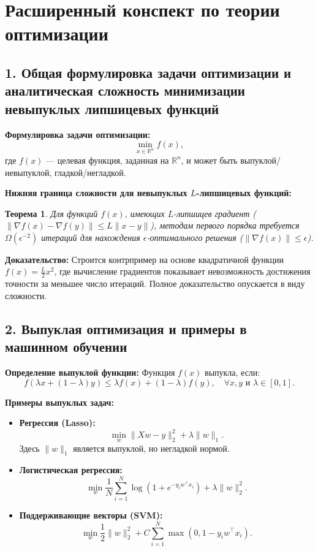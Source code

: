 \documentclass[a4paper,12pt]{article}
\newtheorem{theorem}{Теорема}
\begin{document}
\section*{Расширенный конспект по теории оптимизации}

\subsection*{1. Общая формулировка задачи оптимизации и аналитическая сложность минимизации невыпуклых липшицевых функций}
\textbf{Формулировка задачи оптимизации:}
\[
\min_{x \in \mathbb{R}^n} f(x),
\]
где \(f(x)\) --- целевая функция, заданная на \(\mathbb{R}^n\), и может быть выпуклой/невыпуклой, гладкой/негладкой.

\textbf{Нижняя граница сложности для невыпуклых \(L\)-липшицевых функций:}
\begin{theorem}
Для функций \(f(x)\), имеющих \(L\)-липшицев градиент (\(\|\nabla f(x) - \nabla f(y)\| \leq L\|x - y\|\)), методам первого порядка требуется \(\Omega(\epsilon^{-2})\) итераций для нахождения \(\epsilon\)-оптимального решения (\(\|\nabla f(x)\| \leq \epsilon\)).
\end{theorem}

\textbf{Доказательство:} Строится контрпример на основе квадратичной функции \(f(x) = \frac{L}{2}x^2\), где вычисление градиентов показывает невозможность достижения точности за меньшее число итераций. Полное доказательство опускается в виду сложности.

\subsection*{2. Выпуклая оптимизация и примеры в машинном обучении}
\textbf{Определение выпуклой функции:}
Функция \(f(x)\) выпукла, если:
\[
f(\lambda x + (1 - \lambda)y) \leq \lambda f(x) + (1-\lambda)f(y), \quad \forall x, y \text{ и } \lambda \in [0, 1].
\]

\textbf{Примеры выпуклых задач:}
\begin{itemize}
    \item \textbf{Регрессия (Lasso):}
    \[
    \min_w \|Xw - y\|_2^2 + \lambda \|w\|_1.
    \]
    Здесь \(\|w\|_1\) является выпуклой, но негладкой нормой.
    \item \textbf{Логистическая регрессия:}
    \[
    \min_w \frac{1}{N} \sum_{i=1}^N \log(1 + e^{-y_i w^\top x_i}) + \lambda \|w\|_2^2.
    \]
    \item \textbf{Поддерживающие векторы (SVM):}
    \[
    \min_w \frac{1}{2}\|w\|_2^2 + C \sum_{i=1}^N \max(0, 1 - y_i w^\top x_i).
    \]
\end{itemize}
\end{document}
